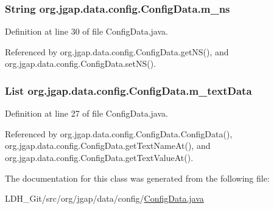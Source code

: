 \hypertarget{classorg_1_1jgap_1_1data_1_1config_1_1_config_data_a33e433fa589fbce2c640d00ae302f9da}{
\subsubsection[{m\-\_\-ns}]{\setlength{\rightskip}{0pt plus 5cm}String org.\-jgap.\-data.\-config.\-Config\-Data.\-m\-\_\-ns\hspace{0.3cm}{\ttfamily [private]}}}\label{classorg_1_1jgap_1_1data_1_1config_1_1_config_data_a33e433fa589fbce2c640d00ae302f9da}


Definition at line 30 of file Config\-Data.\-java.



Referenced by org.\-jgap.\-data.\-config.\-Config\-Data.\-get\-N\-S(), and org.\-jgap.\-data.\-config.\-Config\-Data.\-set\-N\-S().

\hypertarget{classorg_1_1jgap_1_1data_1_1config_1_1_config_data_a17a23726b5e741f23161b1b0f9ac4b31}{
\subsubsection[{m\-\_\-text\-Data}]{\setlength{\rightskip}{0pt plus 5cm}List org.\-jgap.\-data.\-config.\-Config\-Data.\-m\-\_\-text\-Data\hspace{0.3cm}{\ttfamily [private]}}}\label{classorg_1_1jgap_1_1data_1_1config_1_1_config_data_a17a23726b5e741f23161b1b0f9ac4b31}


Definition at line 27 of file Config\-Data.\-java.



Referenced by org.\-jgap.\-data.\-config.\-Config\-Data.\-Config\-Data(), org.\-jgap.\-data.\-config.\-Config\-Data.\-get\-Text\-Name\-At(), and org.\-jgap.\-data.\-config.\-Config\-Data.\-get\-Text\-Value\-At().



The documentation for this class was generated from the following file\-:\begin{DoxyCompactItemize}
\item 
L\-D\-H\-\_\-\-Git/src/org/jgap/data/config/\hyperlink{_config_data_8java}{Config\-Data.\-java}\end{DoxyCompactItemize}
